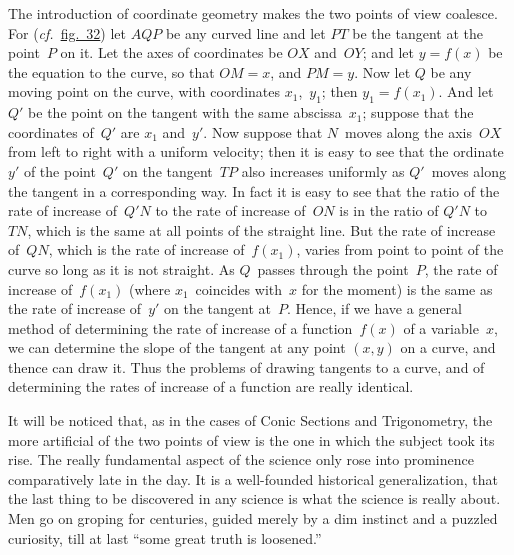 \documentclass[12pt,leqno]{book}[2005/09/16]
\newcommand{\Typo}[2]{#2}
\newcommand{\Chg}[2]{#2}
\newcommand{\Fig}[2][Fig.]{\hyperref[fig:#2]{#1~#2}}
\newcommand{\PageSep}[1]{\ignorespaces}
\newcommand{\cf}{\emph{cf.}}
\begin{document}
The introduction of coordinate geometry
%
makes the two points of view coalesce. For
(\Chg{cf.}{\cf}\ \Fig[fig.]{32}) let $AQP$ be any curved line and let
$PT$ be the tangent at the point~$P$ on it. Let
the axes of coordinates be $OX$ and~$OY$; and
let $y = f(x)$ be the equation to the curve, so that
$OM = x$, and $PM = y$. Now let $Q$ be any
moving point on the curve, with coordinates
$x_{1}$,~$y_{1}$; then $y_{1} = f(x_{1})$. And let $Q'$ be the point
on the tangent with the same abscissa~$x_{1}$;
suppose that the coordinates of~$Q'$ are $x_{1}$ and~$y'$.
Now suppose that $N$~moves along the
axis~$OX$ from left to right with a uniform
velocity; then it is easy to see that the ordinate~$y'$
of the point~$Q'$ on the tangent~$TP$ also
increases uniformly as $Q'$~moves along the
tangent in a corresponding way. In fact it is
easy to see that the ratio of the rate of increase
of~$Q'N$ to the rate of increase of~$ON$ is in the
ratio of $Q'N$ to~$TN$, which is the same at all
points of the straight line. But the rate of
increase of~$QN$, which is the rate of increase
of~$f(x_{1})$, varies from point to point of the curve
so long as it is not straight. As $Q$~passes
through the point~$P$, the rate of increase of~$f(x_{1})$
(where $x_{1}$~coincides with~$x$ for the moment)
\PageSep{223}
is the same as the rate of increase of~$y'$ on the
tangent at~$P$. Hence, if we have a general
method of determining the rate of increase
of a function~$f(x)$ of a variable~$x$, we can
determine the slope of the tangent at any
point $(x, y\Typo{,}{})$ on a curve, and thence can
draw it. Thus the problems of drawing tangents
to a curve, and of determining the
rates of increase of a function are really
identical.

It will be noticed that, as in the cases of
Conic Sections and Trigonometry, the more
artificial of the two points of view is the one
in which the subject took its rise. The really
fundamental aspect of the science only rose
into prominence comparatively late in the
day. It is a well-founded historical generalization,
that the last thing to be discovered
in any science is what the science is really
about. Men go on groping for centuries,
guided merely by a dim instinct and a puzzled
curiosity, till at last ``some great truth is
loosened.''
\end{document}
